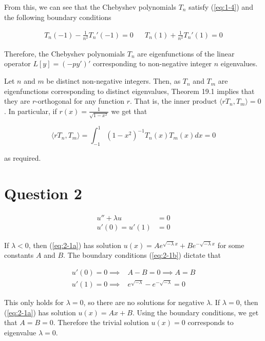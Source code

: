 \documentclass{article}
\begin{document}
From this, we can see that the Chebyshev polynomials $T_n$ satisfy (\ref{eq:1-4}) and the
following boundary conditions

\begin{align} \label{eq:1-6}
    T_n(-1) - \frac{1}{n^2}T_n'(-1) = 0 && T_n(1) + \frac{1}{n^2}T_n'(1) = 0
\end{align}

Therefore, the Chebyshev polynomials $T_n$ are eigenfunctions of the linear operator
$L[y] = (-py')'$ corresponding to non-negative integer $n$ eigenvalues.

\hfill\break
Let $n$ and $m$ be distinct non-negative integers. Then, as $T_n$ and $T_m$
are eigenfunctions corresponding to distinct eigenvalues, Theorem 19.1 implies
that they are $r$-orthogonal for any function $r$. That is, the inner product
$\langle rT_n, T_m \rangle = 0$. In particular, if $r(x) = \frac{1}{\sqrt{1 - x^2}}$
we get that

\begin{equation*}
    \langle rT_n, T_m \rangle = \int_{-1}^{1}(1 - x^2)^{-1}T_n(x)T_m(x) dx = 0
\end{equation*}

as required.

\section*{Question 2}

\begin{align} 
    u'' + \lambda u &= 0 \label{eq:2-1a}\\
    u'(0) = u'(1) &= 0 \label{eq:2-1b}
\end{align}

 If $\lambda < 0$, then (\ref{eq:2-1a}) has solution
 $u(x) = Ae^{\sqrt{-\lambda}x} + Be^{-\sqrt{-\lambda}x}$ for some constants
 $A$ and $B$. The boundary conditions (\ref{eq:2-1b}) dictate that

 \begin{align*}
    u'(0) = 0 \implies& A - B = 0 \implies A = B\\
    u'(1) = 0 \implies& e^{\sqrt{-\lambda}} - e^{-\sqrt{-\lambda}} = 0
 \end{align*}

 This only holds for $\lambda = 0$, so there are no solutions for negative $\lambda$.
 If $\lambda = 0$, then (\ref{eq:2-1a}) has solution $u(x) = Ax + B$. Using the boundary
 conditions, we get that $A = B = 0$. Therefore the trivial solution $u(x) = 0$ corresponds
 to eigenvalue $\lambda = 0$.
\end{document}
